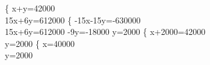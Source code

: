 \left \{  {x+y=42000 \\15x+6y=612000} \; \rightarrow 
\left \{  {-15x-15y=-630000 \\15x+6y=612000} \; \rightarrow
{-9y=-18000} \; \rightarrow
{y=2000} \; \rightarrow
\left \{  {x+2000=42000 \\y=2000} \; \rightarrow
\left \{  {x=40000 \\y=2000} \;  
